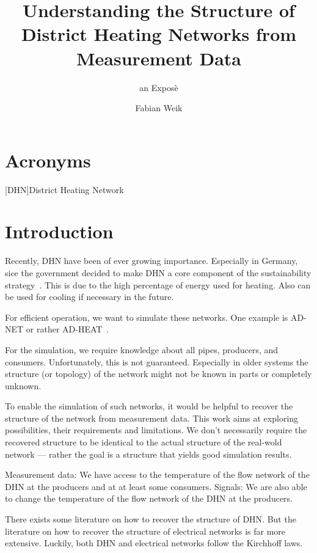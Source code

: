 \documentclass{scrartcl}
\title{Understanding the Structure of District Heating Networks from Measurement Data}
\subtitle{an Exposè}
\author{Fabian Weik}
\begin{document}
    \maketitle

    \section{Acronyms}

    \begin{acronym}
        [DHN]{District Heating Network}
    \end{acronym}

    \section{Introduction}

    Recently, \ac{DHN} have been of ever growing importance.
    Especially in Germany, sice the government decided to make \ac{DHN} a core component of the sustainability strategy~\cite{regierung2024heatingplanning}.
    This is due to the high percentage of energy used for heating.
    Also can be used for cooling if necessary in the future.

    For efficient operation, we want to simulate these networks.
    One example is AD-NET or rather AD-HEAT~\cite{adnetheat}.

    For the simulation, we require knowledge about all pipes, producers, and consumers.
    Unfortunately, this is not guaranteed.
    Especially in older systems the structure (or topology) of the network might not be known in parts or completely unknown.

    To enable the simulation of such networks, it would be helpful to recover the structure of the network from measurement data.
    This work aims at exploring possibilities, their requirements and limitations.
    We don't necessarily require the recovered structure to be identical to the actual structure of the real-wold network --- rather  the goal is a structure that yields good simulation results.

    Measurement data: We have access to the temperature of the flow network of the \ac{DHN} at the producers and at at least some consumers.
    Signals: We are also able to change the temperature of the flow network of the \ac{DHN} at the producers.

    There exists some literature on how to recover the structure of \ac{DHN}.
    But the literature on how to recover the structure of electrical networks is far more extensive.
    Luckily, both \ac{DHN} and electrical networks follow the Kirchhoff laws.
\end{document}

